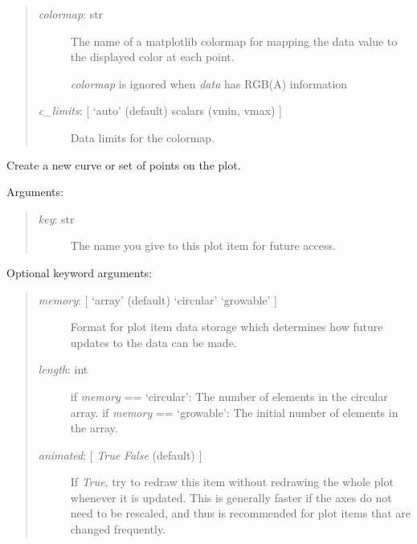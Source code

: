 \documentclass[letterpaper,10pt,english]{sphinxmanual}
\begin{document}
\begin{fulllineitems}
\begin{fulllineitems}
\begin{quote}
\begin{description}
\item[{\emph{colormap}: str}] \leavevmode
The name of a matplotlib colormap for mapping the data value to the
displayed color at each point.

\emph{colormap} is ignored when \emph{data} has RGB(A) information

\item[{\emph{c\_limits}:  {[} `auto' (default) \textbar{} scalars (vmin, vmax) {]}}] \leavevmode
Data limits for the colormap.

\end{description}
\end{quote}

\end{fulllineitems}


\begin{fulllineitems}
\label{api:controls.Plot2D.new_curve}
Create a new curve or set of points on the plot.

Arguments:
\begin{quote}
\begin{description}
\item[{\emph{key}: str}] \leavevmode
The name you give to this plot item for future access.

\end{description}
\end{quote}

Optional keyword arguments:
\begin{quote}
\begin{description}
\item[{\emph{memory}: {[} `array' (default) \textbar{} `circular' \textbar{} `growable' {]}}] \leavevmode
Format for plot item data storage which determines how future updates 
to the data can be made.

\item[{\emph{length}: int}] \leavevmode
if \emph{memory} == `circular': The number of elements in the circular array.
if \emph{memory} == `growable': The initial number of elements in the array.

\item[{\emph{animated}: {[} \emph{True} \textbar{} \emph{False} (default) {]}}] \leavevmode
If \emph{True}, try to redraw this item without redrawing the whole plot
whenever it is updated. This is generally faster if the axes do not
need to be rescaled, and thus is recommended for plot items that 
are changed frequently.


\end{description}
\end{quote}
\end{fulllineitems}
\end{fulllineitems}
\end{document}
